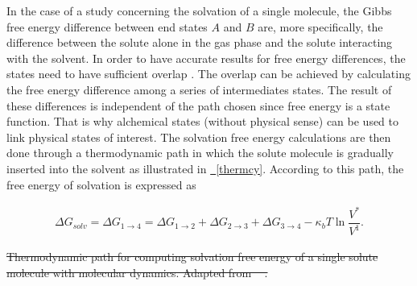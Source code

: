 \documentclass[
	12pt,				%
	openany,			%
	oneside,			%
	a4paper,			%
	english,			%
	brazil				%
	]{abntex2}
\providecommand{\DIFdel}[1]{{\protect\color{red}\sout{#1}}}
\providecommand{\DIFdelbegin}{}
\providecommand{\DIFdelFL}[1]{\DIFdel{#1}}
\newcommand{\figref}[2][{}]{\hyperref[#2]{\figurename~\ref{#2}#1}}
\providecommand{\DIFdel}[1]{{\protect\color{red}\sout{#1}}}                      %
\providecommand{\DIFdelbegin}{} %
\providecommand{\DIFdelFL}[1]{\DIFdel{#1}} %
\begin{document}
In the case of a study concerning the solvation of a single molecule, the Gibbs free energy difference between end states $A$ and $B$ are, more specifically, the difference between the solute alone in the gas phase and the solute interacting with the solvent. In order to have accurate results for free energy differences, the states need to have sufficient overlap  \cite{klimovich}. The overlap can be achieved by calculating the free energy difference among a series of intermediates states. The result of these differences is independent of the path chosen since free energy is a state function. That is why alchemical states (without physical sense) can be used to link physical states of interest. The solvation free energy calculations are then done through a thermodynamic path in which the solute molecule is gradually inserted into the solvent as illustrated in \figref{thermcy}. According to this path, the free energy of solvation is expressed as

\begin{equation}
\label{eq:freesolv}
\begin{aligned}
\Delta G_{solv} = \Delta G_{1 \rightarrow 4} = \Delta G_{1 \rightarrow 2} + \Delta G_{2 \rightarrow 3} + \Delta G_{3 \rightarrow 4}  - \kappa_{b}T \ln \dfrac{V^{*}}{V^{1}} .
\end{aligned}
\end{equation}

\DIFdelbegin %
{%
\DIFdelFL{Thermodynamic path for computing solvation free energy of a single solute molecule with molecular dynamics. Adapted from \mbox{%
\citeonline{klimovich}}%
.}}
\end{document}

